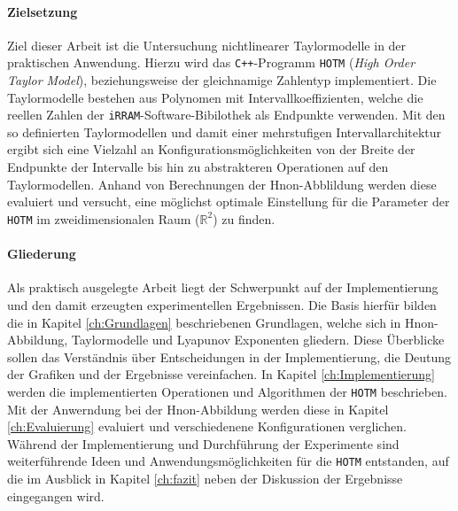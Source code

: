 \paragraph{Zielsetzung}

Ziel dieser Arbeit ist die Untersuchung nichtlinearer Taylormodelle in der praktischen Anwendung. Hierzu wird das \verb.C++.-Programm \verb+HOTM+ (\textit{High Order Taylor Model}), beziehungsweise der gleichnamige Zahlentyp implementiert. Die Taylormodelle bestehen aus Polynomen mit Intervallkoeffizienten, welche die reellen Zahlen der \verb+iRRAM+-Software-Bibilothek als Endpunkte verwenden. Mit den so definierten Taylormodellen und damit einer mehrstufigen Intervallarchitektur ergibt sich eine Vielzahl an Konfigurationsmöglichkeiten von der Breite der Endpunkte der Intervalle bis hin zu abstrakteren Operationen auf den Taylormodellen. Anhand von Berechnungen der H\e non-Abblildung werden diese evaluiert und versucht, eine möglichst optimale Einstellung für die Parameter der \verb+HOTM+ im zweidimensionalen Raum ($\mathbb{R}^2$) zu finden.

\paragraph{Gliederung}

Als praktisch ausgelegte Arbeit liegt der Schwerpunkt auf der Implementierung und den damit erzeugten experimentellen Ergebnissen. Die Basis hierfür bilden die in Kapitel \ref{ch:Grundlagen} beschriebenen Grundlagen, welche sich in H\e non-Abbildung, Taylormodelle und Lyapunov Exponenten gliedern. Diese Überblicke sollen das Verständnis über Entscheidungen in der Implementierung, die Deutung der Grafiken und der Ergebnisse vereinfachen. In Kapitel \ref{ch:Implementierung} werden die implementierten Operationen und Algorithmen der \verb+HOTM+ beschrieben. Mit der Anwerndung bei der H\e non-Abbildung werden diese in Kapitel \ref{ch:Evaluierung} evaluiert und verschiedenene Konfigurationen verglichen. Während der Implementierung und Durchführung der Experimente sind weiterführende Ideen und Anwendungsmöglichkeiten für die \verb+HOTM+ entstanden, auf die im Ausblick in Kapitel \ref{ch:fazit} neben der Diskussion der Ergebnisse eingegangen wird.

